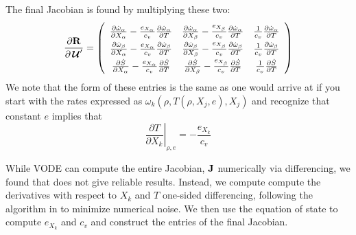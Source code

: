 \documentclass[times,preprint]{aastex63}
\newcommand{\omegadot}{\dot{\omega}}
\newcommand{\Sdot}{\dot{S}}
\newcommand{\Uc}{{\,\bm{\mathcal{U}}}}
\newcommand{\Rb}{{\bf R}}
\begin{document}
The final Jacobian is found by multiplying these two:
\begin{equation}
\renewcommand{\arraystretch}{1.5}
\frac{\partial \Rb}{\partial \Uc^\prime} = \left (
  \begin{array}{ccc}
    \frac{\partial \omegadot_\alpha}{\partial X_\alpha} - \frac{e_{X_\alpha}}{c_v} \frac{\partial \omegadot_\alpha}{\partial T} &
    \frac{\partial \omegadot_\alpha}{\partial X_\beta} - \frac{e_{X_\beta}}{c_v} \frac{\partial \omegadot_\alpha}{\partial T} &
    \frac{1}{c_v} \frac{\partial \omegadot_\alpha}{\partial T} \\
    \frac{\partial \omegadot_\beta}{\partial X_\alpha} - \frac{e_{X_\alpha}}{c_v} \frac{\partial \omegadot_\beta}{\partial T} &
    \frac{\partial \omegadot_\beta}{\partial X_\beta} - \frac{e_{X_\beta}}{c_v} \frac{\partial \omegadot_\beta}{\partial T} &
    \frac{1}{c_v} \frac{\partial \omegadot_\beta}{\partial T} \\
     \frac{\partial \Sdot}{\partial X_\alpha} -  \frac{e_{X_\alpha}}{c_v} \frac{\partial \Sdot}{\partial T} &
     \frac{\partial \Sdot}{\partial X_\beta} -  \frac{e_{X_\beta}}{c_v} \frac{\partial \Sdot}{\partial T} &
     \frac{1}{c_v} \frac{\partial \Sdot}{\partial T} \\
  \end{array}
  \right )
\renewcommand{\arraystretch}{1}
\end{equation}
We note that the form of these entries is the same as one would arrive at if you start with the rates expressed as
$\omega_k(\rho, T(\rho, X_j, e), X_j)$ and recognize that constant $e$ implies that
\begin{equation}
\left . \frac{\partial T}{\partial X_k} \right |_{\rho, e} = - \frac{e_{X_k}}{c_v}
\end{equation}

While VODE can compute the entire Jacobian, ${\bf J}$ numerically via
differencing, we found that does not give reliable results.  Instead,
we compute compute the derivatives with respect to $X_k$ and $T$
one-sided differencing, following the algorithm in \cite{lsode} to
minimize numerical noise.  We then use the equation of state to
compute $e_{X_k}$ and $c_v$ and construct the entries of the final
Jacobian.





\end{document}
